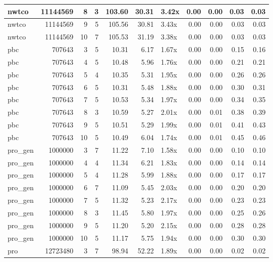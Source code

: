 \begin{table}[ht]
\begin{tabular}{lrrrrrlrrrr}
   \hline
nwtco & 11144569 &   8 &   3 & 103.60 & 30.31 & 3.42x & 0.00 & 0.00 & 0.03 & 0.03 \\ 
   \hline
nwtco & 11144569 &   9 &   5 & 105.56 & 30.81 & 3.43x & 0.00 & 0.00 & 0.03 & 0.03 \\ 
   \hline
nwtco & 11144569 &  10 &   7 & 105.53 & 31.19 & 3.38x & 0.00 & 0.00 & 0.03 & 0.03 \\ 
   \hline
pbc & 707643 &   3 &   5 & 10.31 & 6.17 & 1.67x & 0.00 & 0.00 & 0.15 & 0.16 \\ 
   \hline
pbc & 707643 &   4 &   5 & 10.48 & 5.96 & 1.76x & 0.00 & 0.00 & 0.21 & 0.21 \\ 
   \hline
pbc & 707643 &   5 &   4 & 10.35 & 5.31 & 1.95x & 0.00 & 0.00 & 0.26 & 0.26 \\ 
   \hline
pbc & 707643 &   6 &   5 & 10.31 & 5.48 & 1.88x & 0.00 & 0.00 & 0.30 & 0.31 \\ 
   \hline
pbc & 707643 &   7 &   5 & 10.53 & 5.34 & 1.97x & 0.00 & 0.00 & 0.34 & 0.35 \\ 
   \hline
pbc & 707643 &   8 &   3 & 10.59 & 5.27 & 2.01x & 0.00 & 0.01 & 0.38 & 0.39 \\ 
   \hline
pbc & 707643 &   9 &   5 & 10.51 & 5.29 & 1.99x & 0.00 & 0.01 & 0.41 & 0.43 \\ 
   \hline
pbc & 707643 &  10 &   5 & 10.49 & 6.04 & 1.74x & 0.00 & 0.01 & 0.45 & 0.46 \\ 
   \hline
pro\_gen & 1000000 &   3 &   7 & 11.22 & 7.10 & 1.58x & 0.00 & 0.00 & 0.10 & 0.10 \\ 
   \hline
pro\_gen & 1000000 &   4 &   4 & 11.34 & 6.21 & 1.83x & 0.00 & 0.00 & 0.14 & 0.14 \\ 
   \hline
pro\_gen & 1000000 &   5 &   4 & 11.28 & 5.99 & 1.88x & 0.00 & 0.00 & 0.17 & 0.17 \\ 
   \hline
pro\_gen & 1000000 &   6 &   7 & 11.09 & 5.45 & 2.03x & 0.00 & 0.00 & 0.20 & 0.20 \\ 
   \hline
pro\_gen & 1000000 &   7 &   5 & 11.32 & 5.23 & 2.17x & 0.00 & 0.00 & 0.23 & 0.23 \\ 
   \hline
pro\_gen & 1000000 &   8 &   3 & 11.45 & 5.80 & 1.97x & 0.00 & 0.00 & 0.25 & 0.26 \\ 
   \hline
pro\_gen & 1000000 &   9 &   5 & 11.20 & 5.20 & 2.15x & 0.00 & 0.00 & 0.28 & 0.28 \\ 
   \hline
pro\_gen & 1000000 &  10 &   5 & 11.17 & 5.75 & 1.94x & 0.00 & 0.00 & 0.30 & 0.30 \\ 
   \hline
pro & 12723480 &   3 &   7 & 98.94 & 52.22 & 1.89x & 0.00 & 0.00 & 0.02 & 0.02 \\ 

\end{tabular}
\end{table}
